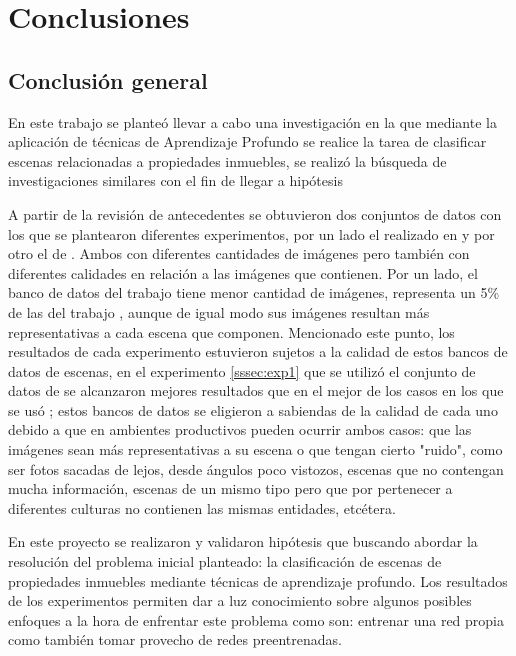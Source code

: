 \section{Conclusiones}

\subsection{Conclusión general}
En este trabajo se planteó llevar a cabo una investigación en la que mediante la aplicación de técnicas de Aprendizaje Profundo se realice la tarea de clasificar escenas relacionadas a propiedades inmuebles, se realizó la búsqueda de investigaciones similares con el fin de llegar a hipótesis 

A partir de la revisión de antecedentes se obtuvieron dos conjuntos de datos con los que se plantearon diferentes experimentos, por un lado el realizado en \cite{vision_based_real_estate_price_estimation} y por otro el de \cite{lstm_real_estate}. Ambos con diferentes cantidades de imágenes pero también con diferentes calidades en relación a las imágenes que contienen. Por un lado, el banco de datos del trabajo \cite{lstm_real_estate} tiene menor cantidad de imágenes, representa un 5\% de las del trabajo \cite{vision_based_real_estate_price_estimation}, aunque de igual modo sus imágenes resultan más representativas a cada escena que componen. Mencionado este punto, los resultados de cada experimento estuvieron sujetos a la calidad de estos bancos de datos de escenas, en el experimento \ref{sssec:exp1} que se utilizó el conjunto de datos de \cite{lstm_real_estate} se alcanzaron mejores resultados que en el mejor de los casos en los que se usó \cite{vision_based_real_estate_price_estimation}; estos bancos de datos se eligieron a sabiendas de la calidad de cada uno debido a que en ambientes productivos pueden ocurrir ambos casos: que las imágenes sean más representativas a su escena o que tengan cierto "ruido", como ser fotos sacadas de lejos, desde ángulos poco vistozos, escenas que no contengan mucha información, escenas de un mismo tipo pero que por pertenecer a diferentes culturas no contienen las mismas entidades, etcétera. 

En este proyecto se realizaron y validaron hipótesis que buscando abordar la resolución del problema inicial planteado: la clasificación de escenas de propiedades inmuebles mediante técnicas de aprendizaje profundo.
Los resultados de los experimentos permiten dar a luz conocimiento sobre algunos posibles enfoques a la hora de enfrentar este problema como son: entrenar una red propia como también tomar provecho de redes preentrenadas. 

